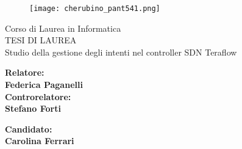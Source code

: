 \documentclass[12pt]{report}
\begin{document}
\begin{titlepage}
\begin{figure}
    \centering\texttt{[image: cherubino\_pant541.png]}
\end{figure}

\begin{center}
    {\LARGE{ Corso di Laurea in Informatica \\}}
    \vspace{2cm}
    {\Large { TESI DI LAUREA }}\\
    \vspace{2cm}
    {\Large { Studio della gestione degli intenti nel controller SDN Teraflow }}
\end{center}

\vspace{2cm}

\begin{minipage}[t]{0.47\textwidth}
	{\large{\bf Relatore:\\ Federica Paganelli}}
	\vspace{0.5cm}
	{\large{\bf \\Controrelatore:\\ Stefano Forti}}
\end{minipage}\hfill
\begin{minipage}[t]{0.47\textwidth}\raggedleft
	{\large{\bf Candidato: \\ Carolina Ferrari\\ }}
\end{minipage}

\vspace{25mm}

\end{titlepage}


\end{document}
